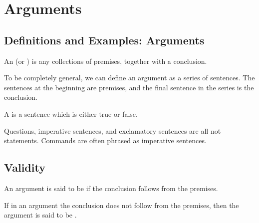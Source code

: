 %
%
%
\chapter{Arguments}
\label{Arg} %

\section{ Definitions and Examples: Arguments}

\begin{definition}
    An  (or ) is any collections of premises, together with a conclusion.

    To be completely general, we can define an argument as a series of sentences. The sentences at the beginning are premises, and the final sentence in the series is the conclusion.
\end{definition}

\begin{definition}
    A  is a sentence which is either true or false.
\end{definition}


\begin{remark}
    Questions, imperative sentences, and exclamatory sentences are all not statements. Commands are often phrased as imperative sentences.
\end{remark}



\section{ Validity}

\begin{definition}{}
    An argument is said to be  if the conclusion follows from the premises.
\end{definition}

\begin{definition}{}
    If in an argument the conclusion does not follow from the premises, then the argument is said to be .
\end{definition}


